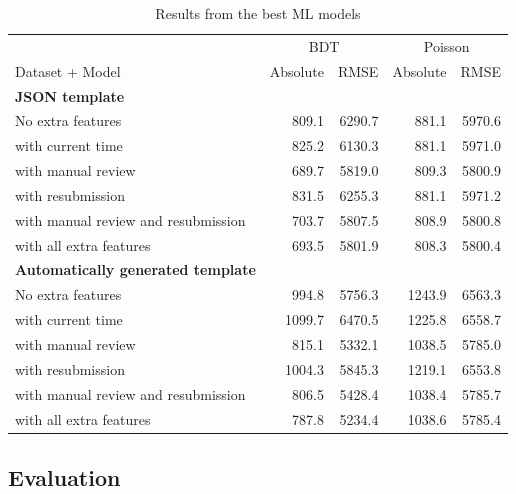 \begin{table}[htb]
\begin{center}
\begin{tabularx}{\linewidth}{| X | r | r | r | r |}
\hline
~ & \multicolumn{2}{c|}{BDT} & \multicolumn{2}{c|}{Poisson} \\
Dataset + Model & Absolute & RMSE & Absolute & RMSE \\
\hline
\textbf{JSON template} &  &  &  &  \\
No extra features                   & 809.1 & 6290.7 & 881.1 & 5970.6 \\
with current time                   & 825.2 & 6130.3 & 881.1 & 5971.0 \\
with manual review                  & 689.7 & 5819.0 & 809.3 & 5800.9 \\
with resubmission                   & 831.5 & 6255.3 & 881.1 & 5971.2 \\
with manual review and resubmission & 703.7 & 5807.5 & 808.9 & 5800.8 \\
with all extra features             & 693.5 & 5801.9 & 808.3 & 5800.4 \\
\hline
\textbf{Automatically generated template} &  &  &  &  \\
No extra features                   & 994.8 & 5756.3 & 1243.9 & 6563.3 \\
with current time                   & 1099.7 & 6470.5 & 1225.8 & 6558.7 \\
with manual review                  & 815.1 & 5332.1 & 1038.5 & 5785.0 \\
with resubmission                   & 1004.3 & 5845.3 & 1219.1 & 6553.8 \\
with manual review and resubmission & 806.5 & 5428.4 & 1038.4 & 5785.7 \\
with all extra features             & 787.8 & 5234.4 & 1038.6 & 5785.4 \\
\hline
\end{tabularx}
\end{center}
\caption{Results from the best ML models}
\label{tab:mlresults}
\end{table}

\subsection{Evaluation}
\label{sec:evaluation}


